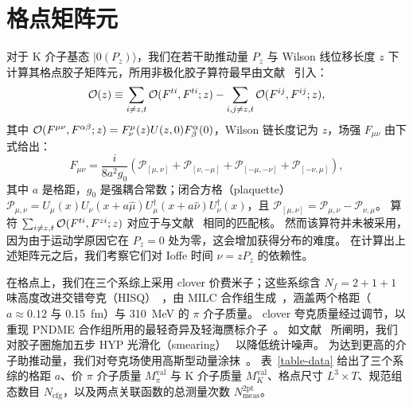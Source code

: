 \section{格点矩阵元}\label{sec:lattice-details}

对于 K 介子基态 $|0 (P_z) \rangle$，我们在若干助推动量 $P_z$ 与 Wilson 线位移长度 $z$ 下计算其格点胶子矩阵元，所用非极化胶子算符最早由文献~\cite{Balitsky:2019krf} 引入：
%
\begin{equation}\label{eq:gluon_operator}
 {\cal O}(z)\equiv\sum_{i\neq z,t}{\cal O}(F^{ti},F^{ti};z)-\sum_{i,j\neq z,t}{\cal O}(F^{ij},F^{ij};z),
\end{equation}
%
其中 ${\cal O}(F^{\mu\nu}, F^{\alpha\beta};z) = F^\mu_\nu(z)U(z,0)F^\alpha_\beta(0)$，Wilson 链长度记为 $z$，场强 $F_{\mu\nu}$ 由下式给出：
%
\begin{equation}\label{field_strength}
 F_{\mu\nu} = \frac{i}{8a^2g_0}\left(\mathcal{P}_{[\mu,\nu]}+\mathcal{P}_{[\nu,-\mu]}+\mathcal{P}_{[-\mu,-\nu]}+\mathcal{P}_{[-\nu,\mu]}\right),
\end{equation}
%
其中 $a$ 是格距，$g_0$ 是强耦合常数；闭合方格（plaquette）$\mathcal{P_{\mu,\nu}}=U_\mu(x)U_\nu(x+a\hat{\mu})U^\dag_\mu(x+a\hat{\nu})U^\dag_\nu(x)$，且 $\mathcal{P_{[\mu,\nu]}}=\mathcal{P}_{\mu,\nu}-\mathcal{P}_{\nu,\mu}$。
算符 $\sum_{i\neq z,t}{\cal O}(F^{ti},F^{zi};z)$ 对应于与文献~\cite{Balitsky:2019krf} 相同的匹配核。
然而该算符并未被采用，因为由于运动学原因它在 $P_z=0$ 处为零，这会增加获得分布的难度。
在计算出上述矩阵元之后，我们考察它们对 Ioffe 时间 $\nu=zP_z$ 的依赖性。

在格点上，我们在三个系综上采用 clover 价费米子；这些系综含 $N_f=2+1+1$ 味高度改进交错夸克（HISQ）~\cite{Follana:2006rc}，由 MILC 合作组生成~\cite{MILC:2010pul,Bazavov:2012xda}，涵盖两个格距（$a\approx 0.12$ 与 0.15~fm）与 310~MeV 的 $\pi$ 介子质量。
clover 夸克质量经过调节，以重现 PNDME 合作组所用的最轻奇异及轻海赝标介子~\cite{Rajan:2017lxk,Bhattacharya:2015wna,Bhattacharya:2015esa,Bhattacharya:2013ehc}。
如文献~\cite{Fan:2018dxu} 所阐明，我们对胶子圈施加五步 HYP 光滑化（smearing）~\cite{Hasenfratz:2001hp} 以降低统计噪声。
为达到更高的介子助推动量，我们对夸克场使用高斯型动量涂抹~\cite{Bali:2016lva}。
表~\ref{table-data} 给出了三个系综的格距 $a$、价 $\pi$ 介子质量 $M_\pi^\text{val}$ 与 K 介子质量 $M_K^\text{val}$、格点尺寸 $L^3\times T$、规范组态数目 $N_\text{cfg}$，以及两点关联函数的总测量次数 $N_\text{meas}^\text{2pt}$。


